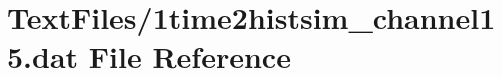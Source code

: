 \hypertarget{1time2histsim__channel15_8dat}{}\section{Text\+Files/1time2histsim\+\_\+channel15.dat File Reference}
\label{1time2histsim__channel15_8dat}
